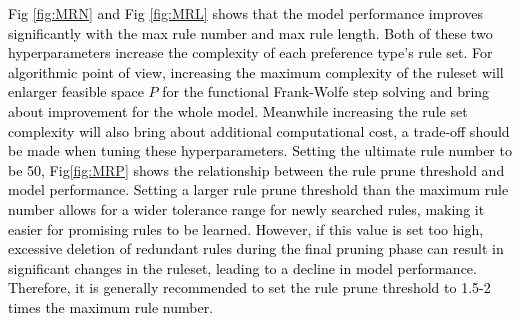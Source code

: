 \documentclass{article} %
\begin{document}
\textcolor{black}{Fig \ref{fig:MRN} and Fig \ref{fig:MRL} shows that the model performance improves significantly with the max rule number and max rule length. Both of these two hyperparameters increase the complexity of each preference type's rule set. For algorithmic point of view, increasing the maximum complexity of the ruleset will enlarger feasible space $P$ for the functional Frank-Wolfe step solving and bring about improvement for the whole model. Meanwhile increasing the rule set complexity will also bring about additional computational cost, a trade-off should be made when tuning these hyperparameters. Setting the ultimate rule number to be 50, Fig\ref{fig:MRP} shows the relationship between the rule prune threshold and model performance. Setting a larger rule prune threshold than the maximum rule number allows for a wider tolerance range for newly searched rules, making it easier for promising rules to be learned. However, if this value is set too high, excessive deletion of redundant rules during the final pruning phase can result in significant changes in the ruleset, leading to a decline in model performance. Therefore, it is generally recommended to set the rule prune threshold to 1.5-2 times the maximum rule number.
}
\end{document}
